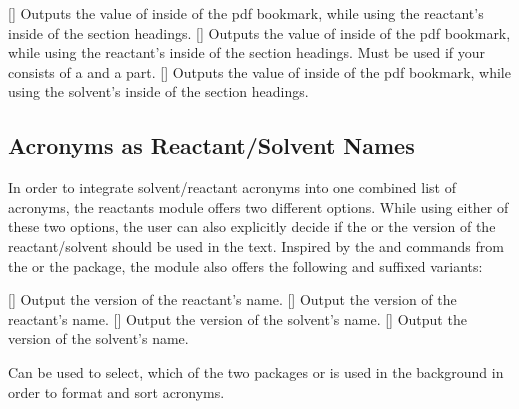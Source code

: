 \documentclass{chemmacros-manual}
\begin{document}
\begin{commands}
  []
    Outputs the value of  inside of the \ac{pdf} bookmark,
    while using the reactant's  inside of the  section headings.
  []
     Outputs the value of  inside of the \ac{pdf} bookmark,
     while using the reactant's  inside of the  section
     headings. Must be used if your  consists of a 
    and a    part. 
  []
    Outputs the value of  inside of the \ac{pdf} bookmark,
    while using the solvent's  inside of the  section headings.
\end{commands}


\subsection{Acronyms as Reactant/Solvent Names}\label{sec:acronyms-in-reactants}

In order to integrate solvent/reactant acronyms into one combined list of
acronyms, the reactants module offers two different options. While using
either of these two options, the user can also explicitly decide if the
 or the  version of the reactant/solvent should be
used in the text. Inspired by the  and  commands from the
 or the  package, the 
module also offers the following  and  suffixed variants:

\begin{commands}
  []
    Output the  version of the reactant's name.
  []
    Output the  version of the reactant's name.
  []
    Output the  version of the solvent's name.
  []
    Output the  version of the solvent's name.
\end{commands}

\begin{options}
    Can be used to select, which of the two packages  or
     is used in the background in order to format and
    sort acronyms.
\end{options}
\end{document}
